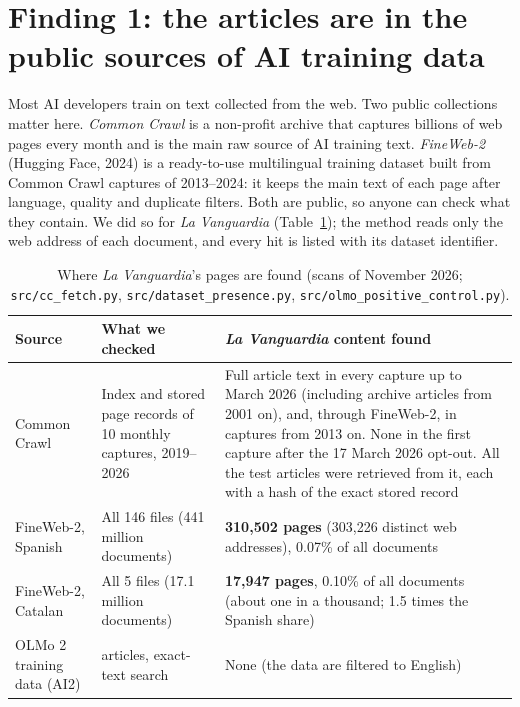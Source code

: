\documentclass[10pt,a4paper]{article}
\begin{document}
\section{Finding 1: the articles are in the public sources of AI training data}\label{sec:presence}
Most AI developers train on text collected from the web. Two public collections matter here.
\emph{Common Crawl} is a non-profit archive that captures billions of web pages every month and is the main raw
source of AI training text. \emph{FineWeb-2} (Hugging Face, 2024) is a ready-to-use multilingual training dataset
built from Common Crawl captures of 2013--2024: it keeps the main text of each page after language, quality and
duplicate filters. Both are public, so anyone can check what they contain. We did so for \emph{La Vanguardia}
(Table~\ref{tab:presence}); the method reads only the web address of each document, and every hit is listed with
its dataset identifier.

\begin{table}[h]\centering\footnotesize
\begin{tabularx}{\linewidth}{>{\raggedright\arraybackslash}p{2.4cm}>{\raggedright\arraybackslash}p{4.2cm}>{\raggedright\arraybackslash}X}
\toprule
Source & What we checked & \emph{La Vanguardia} content found\\
\midrule
Common Crawl & Index and stored page records of 10 monthly captures, 2019--2026 & Full article text in every capture
up to March 2026 (including archive articles from 2001 on), and, through FineWeb-2, in captures from 2013 on.
None in the first capture after the 17 March 2026 opt-out. All the test articles were retrieved from it, each
with a hash of the exact stored record\\
FineWeb-2, Spanish & All 146 files (441 million documents) & \textbf{310,502 pages} (303,226 distinct web addresses),
0.07\% of all documents\\
FineWeb-2, Catalan & All 5 files (17.1 million documents) & \textbf{17,947 pages}, 0.10\% of all documents (about one
in a thousand; 1.5 times the Spanish share)\\
OLMo 2 training data (AI2) & 42 articles, exact-text search & None (the data are filtered to English)\\
\bottomrule
\end{tabularx}
\caption{Where \emph{La Vanguardia}'s pages are found (scans of November 2026; \texttt{src/cc\_fetch.py},
\texttt{src/dataset\_presence.py}, \texttt{src/olmo\_positive\_control.py}).}\label{tab:presence}
\end{table}
\end{document}
